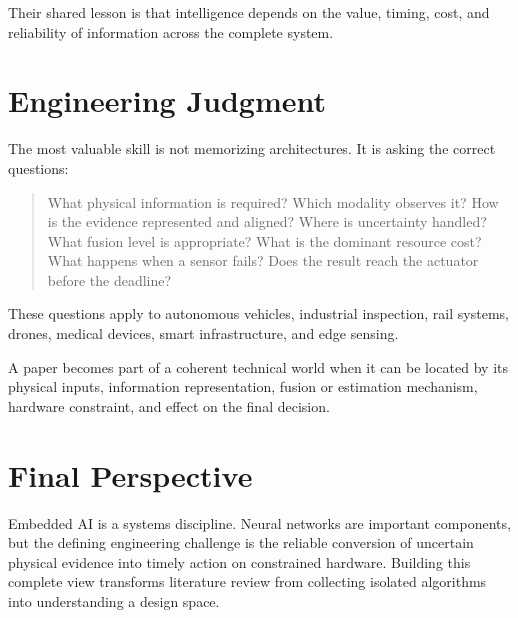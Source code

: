 Their shared lesson is that intelligence depends on the value, timing, cost, and reliability of information across the complete system.

\section{Engineering Judgment}

The most valuable skill is not memorizing architectures. It is asking the correct questions:

\begin{quote}
What physical information is required? Which modality observes it? How is the evidence represented and aligned? Where is uncertainty handled? What fusion level is appropriate? What is the dominant resource cost? What happens when a sensor fails? Does the result reach the actuator before the deadline?
\end{quote}

These questions apply to autonomous vehicles, industrial inspection, rail systems, drones, medical devices, smart infrastructure, and edge sensing.

\begin{keyinsight}
A paper becomes part of a coherent technical world when it can be located by its physical inputs, information representation, fusion or estimation mechanism, hardware constraint, and effect on the final decision.
\end{keyinsight}

\section{Final Perspective}

Embedded AI is a systems discipline. Neural networks are important components, but the defining engineering challenge is the reliable conversion of uncertain physical evidence into timely action on constrained hardware. Building this complete view transforms literature review from collecting isolated algorithms into understanding a design space.
